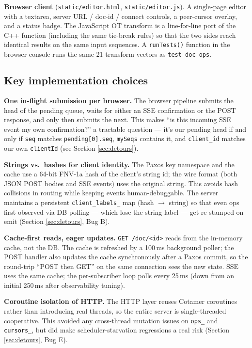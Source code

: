 \documentclass[11pt]{article}
\newcommand{\code}[1]{\texttt{#1}}
\begin{document}
\textbf{Browser client} (\code{static/editor.html}, \code{static/editor.js}). A single-page editor with a textarea, server URL / doc-id / connect controls, a peer-cursor overlay, and a status badge. The JavaScript OT transform is a line-for-line port of the C++ function (including the same tie-break rules) so that the two sides reach identical results on the same input sequences. A \code{runTests()} function in the browser console runs the same 21 transform vectors as \code{test-doc-ops}.

\subsection{Key implementation choices}

\textbf{One in-flight submission per browser.} The browser pipeline submits the head of the pending queue, waits for either an SSE confirmation or the POST response, and only then submits the next. This makes ``is this incoming SSE event my own confirmation?'' a tractable question --- it's our pending head if and only if \code{seq} matches \code{pending[0].seq}, \code{mySeqs} contains it, and \code{client\_id} matches our own \code{clientId} (see Section \ref{sec:detours}).

\textbf{Strings vs.\ hashes for client identity.} The Paxos key namespace and the cache use a 64-bit FNV-1a hash of the client's string id; the wire format (both JSON POST bodies and SSE events) uses the original string. This avoids hash collisions in routing while keeping events human-debuggable. The server maintains a persistent \code{client\_labels\_} map (hash $\rightarrow$ string) so that even ops first observed via DB polling --- which lose the string label --- get re-stamped on emit (Section \ref{sec:detours}, Bug B).

\textbf{Cache-first reads, eager updates.} \code{GET /doc/<id>} reads from the in-memory cache, not the DB. The cache is refreshed by a 100\,ms background poller; the POST handler also updates the cache synchronously after a Paxos commit, so the round-trip ``POST then GET'' on the same connection sees the new state. SSE uses the same cache; the per-subscriber loop polls every 25\,ms (down from an initial 250\,ms after observability tuning).

\textbf{Coroutine isolation of HTTP.} The HTTP layer reuses Cotamer coroutines rather than introducing real threads, so the entire server is single-threaded cooperative. This avoided any cross-thread mutation issues on \code{ops\_} and \code{cursors\_}, but did make scheduler-starvation regressions a real risk (Section \ref{sec:detours}, Bug E).
\end{document}
